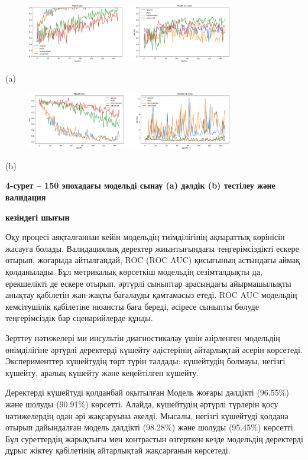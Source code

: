 \begin{figure}[H]
	\centering
	\includegraphics[width=0.8\textwidth]{assets/4}
	\caption*{}
\end{figure}

(a)

\begin{figure}[H]
	\centering
	\includegraphics[width=0.8\textwidth]{assets/5}
	\caption*{}
\end{figure}

(b)

\textbf{4-сурет -- 150 эпохадағы модельді сынау (a) дәлдік (b) тестілеу
және валидация}

\textbf{кезіндегі шығын}

Оқу процесі аяқталғаннан кейін модельдің тиімділігінің ақпараттық
көрінісін жасауға болады. Валидациялық деректер жиынтығындағы
теңгерімсіздікті ескере отырып, жоғарыда айтылғандай, ROC (ROC AUC)
қисығының астындағы аймақ қолданылады. Бұл метрикалық көрсеткіш
модельдің сезімталдықты да, ерекшелікті де ескере отырып, әртүрлі
сыныптар арасындағы айырмашылықты анықтау қабілетін жан-жақты бағалауды
қамтамасыз етеді. ROC AUC модельдің кемсітушілік қабілетіне нюансты баға
береді, әсіресе сыныпты бөлуде теңгерімсіздік бар сценарийлерде құнды.

Зерттеу нәтижелері ми инсультін диагностикалау үшін әзірленген модельдің
өнімділігіне әртүрлі деректерді күшейту әдістерінің айтарлықтай әсерін
көрсетеді. Эксперименттер күшейтудің төрт түрін талдады: күшейтудің
болмауы, негізгі күшейту, аралық күшейту және кеңейтілген күшейту.

Деректерді күшейтуді қолданбай оқытылған Модель жоғары дәлдікті
(96.55\%) және шолуды (90.91\%) көрсетті. Алайда, күшейтудің әртүрлі
түрлерін қосу нәтижелердің одан әрі жақсаруына әкелді. Мысалы, негізгі
күшейтуді қолдана отырып дайындалған модель дәлдікті (98.28\%) және
шолуды (95.45\%) көрсетті. Бұл суреттердің жарықтығы мен контрастын
өзгерткен кезде модельдің деректерді дұрыс жіктеу қабілетінің
айтарлықтай жақсарғанын көрсетеді.

